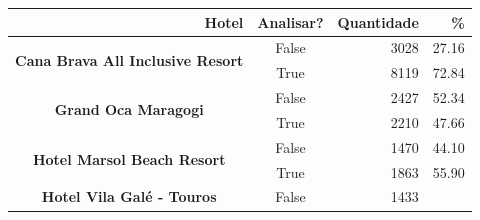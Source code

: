 \begin{table}[]
	\centering
	\begin{tabular}{|c|c|r|r|}
		\hline
		\multicolumn{1}{|r|}{\textbf{Hotel}}                            &
		\multicolumn{1}{r|}{\textbf{Analisar?}}                         &
		\textbf{Quantidade}                                             &
		\textbf{\%}                                                       \\ \hline
		\multirow{2}{*}{\textbf{Cana Brava All Inclusive Resort}}       &
		False                                                           &
		3028                                                            &
		27.16                                                             \\ \cline{2-4}
		                                                                &
		True                                                            &
		8119                                                            &
		72.84                                                             \\ \hline
		\multirow{2}{*}{\textbf{Grand Oca Maragogi}}                    &
		False                                                           &
		2427                                                            &
		52.34                                                             \\ \cline{2-4}
		                                                                &
		True                                                            &
		2210                                                            &
		47.66                                                             \\ \hline
		\multirow{2}{*}{\textbf{Hotel Marsol Beach Resort}}             &
		False                                                           &
		1470                                                            &
		44.10                                                             \\ \cline{2-4}
		                                                                &
		True                                                            &
		1863                                                            &
		55.90                                                             \\ \hline
		\multirow{2}{*}{\textbf{Hotel Vila Galé - Touros}}              &
		False                                                           &
		1433                                                            &

\end{tabular}
\end{table}
